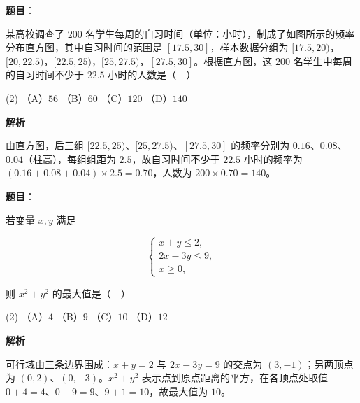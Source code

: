 \begin{answer}

\textbf{题目}：

某高校调查了 \(200\) 名学生每周的自习时间（单位：小时），制成了如图所示的频率分布直方图，其中自习时间的范围是 \([17.5,30]\)，样本数据分组为 \([17.5,20)\)，\([20,22.5)\)，\([22.5,25)\)，\([25,27.5)\)，\([27.5,30]\)。根据直方图，这 \(200\) 名学生中每周的自习时间不少于 \(22.5\) 小时的人数是（　）
\nopagebreak[4]
\begin{center}\end{center}
\nopagebreak[4]
\begin{gkopts}(2)
\task （A）\(56\)
\task （B）\(60\)
\task （C）\(120\)
\task （D）\(140\)
\end{gkopts}

\textbf{解析}

由直方图，后三组 \([22.5,25)\)、\([25,27.5)\)、\([27.5,30]\) 的频率分别为 \(0.16\)、\(0.08\)、\(0.04\)（柱高），每组组距为 \(2.5\)，故自习时间不少于 \(22.5\) 小时的频率为 \((0.16+0.08+0.04)\times 2.5=0.70\)，人数为 \(200\times 0.70=140\)。


\end{answer}
\begin{answer}

\textbf{题目}：

若变量 \(x,y\) 满足

\nopagebreak[4]
\[
\begin{cases}
x+y\leqslant 2,\\
2x-3y\leqslant 9,\\
x\geqslant 0,
\end{cases}
\]

则 \(x^{2}+y^{2}\) 的最大值是（　）

\begin{gkopts}(2)
\task （A）\(4\)
\task （B）\(9\)
\task （C）\(10\)
\task （D）\(12\)
\end{gkopts}

\textbf{解析}

可行域由三条边界围成：\(x+y=2\) 与 \(2x-3y=9\) 的交点为 \((3,-1)\)；另两顶点为 \((0,2)\)、\((0,-3)\)。\(x^{2}+y^{2}\) 表示点到原点距离的平方，在各顶点处取值 \(0+4=4\)、\(0+9=9\)、\(9+1=10\)，故最大值为 \(10\)。


\end{answer}
